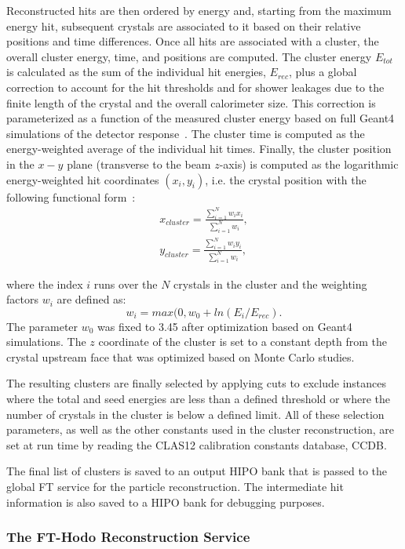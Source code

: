 Reconstructed hits are then ordered by energy and, starting from the maximum energy hit, subsequent crystals
are associated to it based on their relative positions and time differences. Once all hits are associated with a
cluster, the overall cluster energy, time, and positions are computed. The cluster energy $E_{tot}$ is calculated as
the sum of the individual hit energies, $E_{rec}$, plus a global correction to account for the hit thresholds and for
shower leakages due to the finite length of the crystal and the overall calorimeter size. This correction is
parameterized as a function of the measured cluster energy based on full Geant4 simulations of the detector
response~\cite{ft-nim}. The cluster time is computed as the energy-weighted average of the individual hit times.
Finally, the cluster position in the $x-y$ plane (transverse to the beam $z$-axis) is computed as the logarithmic
energy-weighted hit coordinates $(x_i,y_i)$, i.e. the crystal position with the following functional form~\cite{ic}:
\begin{eqnarray*}
x_{cluster} = \frac{\sum_{i=1}^N w_i x_i}{\sum_{i=1}^N w_i},\\
y_{cluster} = \frac{\sum_{i=1}^N w_i y_i}{\sum_{i=1}^N w_i},
\end{eqnarray*}

\noindent
where the index $i$ runs over the $N$ crystals in the cluster and the weighting factors $w_i$ are defined as:
\begin{equation}
w_i=max(0,w_0+ln(E_i/E_{rec}).
\end{equation}
\noindent
The parameter $w_0$ was fixed to 3.45 after optimization based on Geant4 simulations. The $z$ coordinate of
the cluster is set to a constant depth from the crystal upstream face that was optimized based on Monte Carlo
studies.

The resulting clusters are finally selected by applying cuts to exclude instances where the total and seed energies
are less than a defined threshold or where the number of crystals in the cluster is below a defined limit. All of these
selection parameters, as well as the other constants used in the cluster reconstruction, are set at run time by
reading the CLAS12 calibration constants database, CCDB.

The final list of clusters is saved to an output HIPO bank that is passed to the global FT service for the particle
reconstruction. The intermediate hit information is also saved to a HIPO bank for debugging purposes.

\subsubsection{The FT-Hodo Reconstruction Service}

